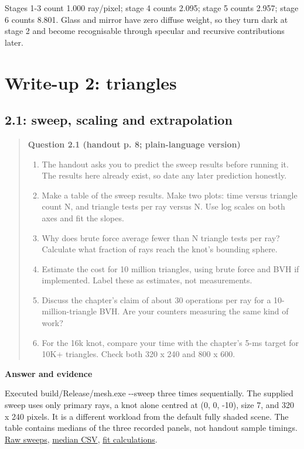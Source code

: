\documentclass[11pt,a4paper]{article}
\begin{document}
Stages 1-3 count 1.000 ray/\allowbreak{}pixel; stage 4 counts 2.095; stage 5 counts 2.957; stage 6 counts 8.801. Glass and mirror have zero diffuse weight, so they turn dark at stage 2 and become recognisable through specular and recursive contributions later.


\section{Write-up 2: triangles}
\subsection*{2.1: sweep, scaling and extrapolation}
\begin{quote}\small
\textbf{Question 2.1 (handout p. 8; plain-language version)}


\begin{enumerate}
\item The handout asks you to predict the sweep results before running it. The results here already exist, so date any later prediction honestly.
\item Make a table of the sweep results. Make two plots: time versus triangle count N, and triangle tests per ray versus N. Use log scales on both axes and fit the slopes.
\item Why does brute force average fewer than N triangle tests per ray? Calculate what fraction of rays reach the knot's bounding sphere.
\item Estimate the cost for 10 million triangles, using brute force and BVH if implemented. Label these as estimates, not measurements.
\item Discuss the chapter's claim of about 30 operations per ray for a 10-million-triangle BVH. Are your counters measuring the same kind of work?
\item For the 16k knot, compare your time with the chapter's 5-ms target for 10K+ triangles. Check both 320 x 240 and 800 x 600.
\end{enumerate}\end{quote}
\textbf{Answer and evidence}


Executed build/\allowbreak{}Release/\allowbreak{}mesh.exe -{}-sweep three times sequentially. The supplied sweep uses only primary rays, a knot alone centred at (0, 0, -10), size 7, and 320 x 240 pixels. It is a different workload from the default fully shaded scene. The table contains medians of the three recorded panels, not handout sample timings. \href{https://github.com/Champy2005/Lab09-RayTracing/blob/main/evidence/data/mesh-sweep-raw.csv}{Raw sweeps}, \href{https://github.com/Champy2005/Lab09-RayTracing/blob/main/evidence/data/mesh-sweep-medians.csv}{median CSV}, \href{https://github.com/Champy2005/Lab09-RayTracing/blob/main/evidence/data/fits.json}{fit calculations}.
\end{document}
